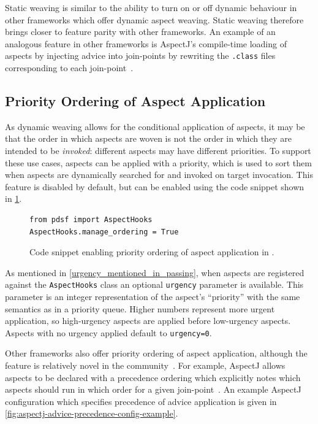 Static weaving is similar to the ability to turn on or off dynamic behaviour in
other \aop frameworks which offer dynamic aspect weaving. Static weaving
therefore brings \pdsfthree closer to feature parity with other \aop frameworks.
An example of an analogous feature in other frameworks is AspectJ's compile-time
loading of aspects by injecting advice into join-points by rewriting the
\lstinline{.class} files corresponding to each
join-point~\cite{aspectj-bytecode-weaving-documentation}. 

\subsection{Priority Ordering of Aspect Application}
\label{aspect_priority_support}

As dynamic weaving allows for the conditional application of aspects, it may be
that the order in which aspects are woven is not the order in which they are
intended to be \emph{invoked}: different aspects may have different priorities.
To support these use cases, aspects can be applied with a priority, which is
used to sort them when aspects are dynamically searched for and invoked on
target invocation. This feature is disabled by default, but can be enabled using
the code snippet shown in \cref{fig:enabling_priority_sorting_of_aspects}.

\begin{figure}[h]
    \begin{lstlisting}[style=footnotesize_python]
from pdsf import AspectHooks
AspectHooks.manage_ordering = True
    \end{lstlisting}
    \caption{Code snippet enabling priority ordering of aspect application in \pdsfthree{}.}
    \label{fig:enabling_priority_sorting_of_aspects}
\end{figure}

As mentioned in \cref{urgency_mentioned_in_passing}, when aspects are registered
against the \lstinline{AspectHooks} class an optional \lstinline{urgency}
parameter is available. This parameter is an integer representation of the
aspect's ``priority'' with the same semantics as in a priority queue. Higher
numbers represent more urgent application, so high-urgency aspects are applied
before low-urgency aspects. Aspects with no urgency applied default to
\lstinline{urgency=0}.

Other \aop frameworks also offer priority ordering of aspect application,
although the feature is relatively novel in the
community~\cite{jalali2012aspect}. For example, AspectJ allows aspects to be
declared with a precedence ordering which explicitly notes which aspects should
run in which order for a given
join-point~\cite{aspectj-advice-precedence-documentation}. An example AspectJ
configuration which specifies precedence of advice application is given in
\cref{fig:aspectj-advice-precedence-config-example}.

